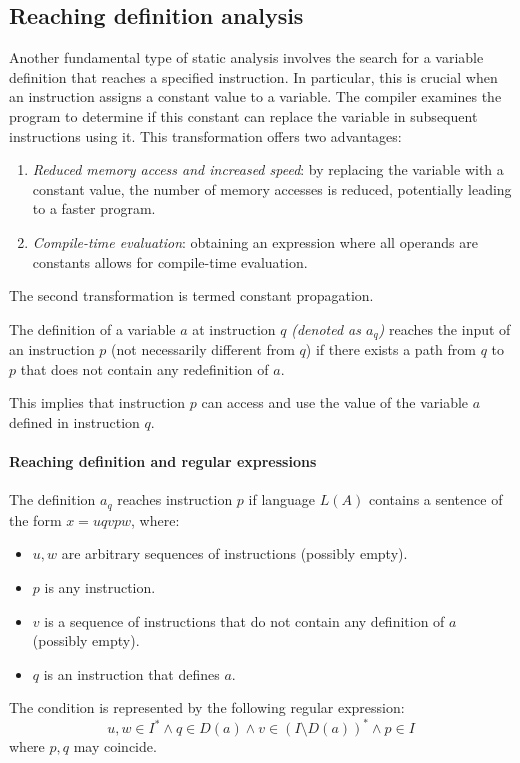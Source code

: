 \subsection{Reaching definition analysis}
Another fundamental type of static analysis involves the search for a variable definition that reaches a specified instruction. 
In particular, this is crucial when an instruction assigns a constant value to a variable. 
The compiler examines the program to determine if this constant can replace the variable in subsequent instructions using it. 
This transformation offers two advantages:
\begin{enumerate}
    \item \textit{Reduced memory access and increased speed}: by replacing the variable with a constant value, the number of memory accesses is reduced, potentially leading to a faster program.
    \item \textit{Compile-time evaluation}: obtaining an expression where all operands are constants allows for compile-time evaluation.
\end{enumerate}
The second transformation is termed constant propagation. 
\begin{definition}
    The definition of a variable $a$ at instruction $q$ \textit{(denoted as $a_q$)} reaches the input of an instruction $p$ (not necessarily different from $q$) if there exists a path from $q$ to $p$ that does not contain any redefinition of $a$.
\end{definition}
This implies that instruction $p$ can access and use the value of the variable $a$ defined in instruction $q$.

\paragraph*{Reaching definition and regular expressions}
The definition $a_q$ reaches instruction $p$ if language $L(A)$ contains a sentence of the form $x = u q v p w$, where:
\begin{itemize}
    \item $u, w$ are arbitrary sequences of instructions (possibly empty). 
    \item $p$ is any instruction.
    \item $v$ is a sequence of instructions that do not contain any definition of $a$ (possibly empty).
    \item $q$ is an instruction that defines $a$.
\end{itemize}
The condition is represented by the following regular expression:
\[ u, w \in I^{*} \land q \in D\left( a \right) \land v \in \left( I \setminus D \left( a \right)\right)^{*} \land p \in I \]
where $p, q$ may coincide.

